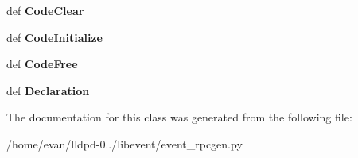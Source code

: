 \begin{DoxyCompactItemize}
\item 
def {\bfseries \-Code\-Clear}\label{classevent__rpcgen_1_1_entry_var_bytes_a7b18b6858614ca342000830c02218696}

\item 
def {\bfseries \-Code\-Initialize}\label{classevent__rpcgen_1_1_entry_var_bytes_a24ae658809888439abef27b3633d22a0}

\item 
def {\bfseries \-Code\-Free}\label{classevent__rpcgen_1_1_entry_var_bytes_a81ad9b6c3af1d0fe115d2b2e54ee8a17}

\item 
def {\bfseries \-Declaration}\label{classevent__rpcgen_1_1_entry_var_bytes_a564a165c99a4874ce9135fc27e62cebc}

\end{DoxyCompactItemize}


\-The documentation for this class was generated from the following file\-:\begin{DoxyCompactItemize}
\item 
/home/evan/lldpd-\/0../libevent/event\-\_\-rpcgen.\-py\end{DoxyCompactItemize}
